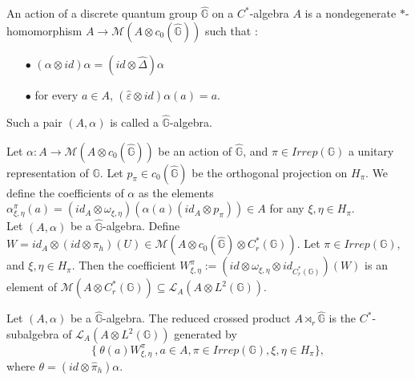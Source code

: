 
\begin{definition} An action of a discrete quantum group $\hat{\mathbb G}$ on a $C^*$-algebra $A$ is a nondegenerate $*$-homomorphism $A\rightarrow \mathcal M(A\otimes c_0(\hat{\mathbb G}))$ such that :
\begin{itemize}
\item[$\bullet$] $(\alpha \otimes id )\alpha = (id\otimes \hat\Delta) \alpha$
\item[$\bullet$] for every $a\in A$, $(\hat\varepsilon \otimes id)\alpha(a) = a$.
\end{itemize}
Such a pair $(A,\alpha)$ is called a $\hat{\mathbb G}$-algebra.
\end{definition}

Let $\alpha : A\rightarrow \mathcal M(A\otimes c_0(\hat{\mathbb G}))$ be an action of $\hat{\mathbb G}$, and $\pi\in Irrep(\mathbb G)$ a unitary representation of $\mathbb G$. Let $p_\pi\in c_0(\hat{\mathbb G}) $ be the orthogonal projection on $H_\pi$. We define the coefficients of $\alpha$ as the elements $\alpha^\pi_{\xi,\eta}(a) = ( id_A \otimes \omega_{\xi,\eta})(\alpha(a)( id _A\otimes p_\pi)) \in A$ for any $\xi,\eta\in H_\pi$.\\  

Let $(A,\alpha)$ be a $\hat{\mathbb G}$-algebra. Define $W= id_A \otimes (id\otimes\pi_h)(U) \in \mathcal M (A\otimes c_0(\hat{\mathbb G})\otimes C^*_r(\mathbb G))  $. Let $\pi\in Irrep(\mathbb G)$, and $\xi,\eta \in H_\pi$. Then the coefficient 
$W^\pi_{\xi,\eta}:=(id\otimes \omega_{\xi,\eta}\otimes id_{C^*_r(\mathbb G)})(W)$ is an element of $\mathcal M(A\otimes C_r^*(\mathbb G)) \subseteq \mathcal L_A(A\otimes L^2(\mathbb G))$. 

\begin{definition} Let $(A,\alpha)$ be a $\hat{\mathbb G}$-algebra. The reduced crossed product $A\rtimes_r \hat{\mathbb G}$ is the $C^*$-subalgebra of $\mathcal L_A(A\otimes L^2(\mathbb G))$ generated by 
\[\{\ \theta(a)W^\pi_{\xi,\eta}\ , a\in A , \pi\in Irrep(\mathbb G),\xi,\eta\in H_\pi\},\]
where $\theta = ( id \otimes  \hat\pi_h)\alpha$.  
\end{definition}

